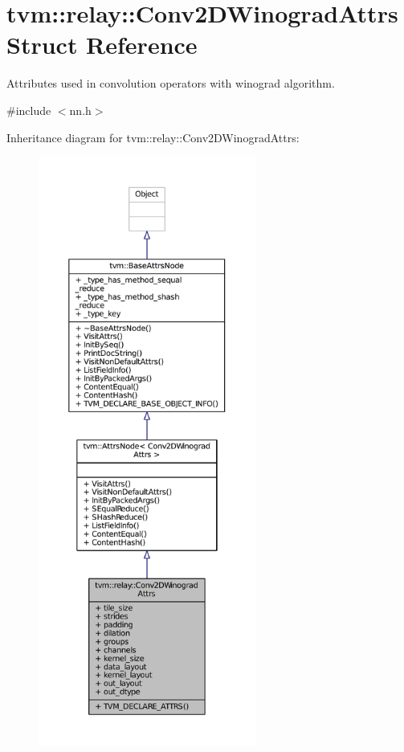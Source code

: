 \hypertarget{structtvm_1_1relay_1_1Conv2DWinogradAttrs}{}\section{tvm\+:\+:relay\+:\+:Conv2\+D\+Winograd\+Attrs Struct Reference}
\label{structtvm_1_1relay_1_1Conv2DWinogradAttrs}


Attributes used in convolution operators with winograd algorithm.  




{\ttfamily \#include $<$nn.\+h$>$}



Inheritance diagram for tvm\+:\+:relay\+:\+:Conv2\+D\+Winograd\+Attrs\+:
\nopagebreak
\begin{figure}[H]
\begin{center}
\leavevmode
\includegraphics[height=550pt]{structtvm_1_1relay_1_1Conv2DWinogradAttrs__inherit__graph}
\end{center}
\end{figure}


